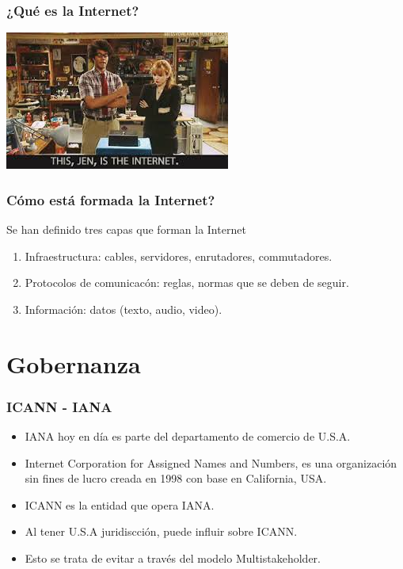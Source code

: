 \documentclass{beamer}
\begin{document}
\begin{frame}
\frametitle{¿Qu\'e es la Internet?}
	\begin{center}
		\includegraphics{../img/the-internet.jpeg}
	\end{center}
\end{frame}


\begin{frame}
\frametitle{C\'omo est\'a formada la Internet?}
	\pause Se han definido tres capas que forman la Internet
		\begin{enumerate}
			\pause \item \alert{Infraestructura}: cables, servidores, enrutadores, commutadores.
			\pause \item \alert{Protocolos de comunicac\'on}: reglas, normas que se deben de seguir.
			\pause \item \alert{Informaci\'on}: datos (texto, audio, video).
		\end{enumerate}
\end{frame}


\section{Gobernanza}

\begin{frame}
\frametitle{ICANN - IANA}
	\begin{itemize}
		\item \pause IANA hoy en d\'ia es parte del departamento de comercio de U.S.A.
		\item \pause \alert{I}nternet \alert{C}orporation for \alert{A}ssigned \alert{N}ames and \alert{N}umbers, es una organizaci\'on sin fines de lucro creada en 1998 con base en California, USA.
		\item \pause ICANN es la entidad que opera IANA.
		\item \pause Al tener U.S.A juridiscci\'on, puede influir sobre ICANN.
		\item \pause Esto se trata de evitar a trav\'es del modelo Multistakeholder.
	\end{itemize}
\end{frame}
\end{document}
